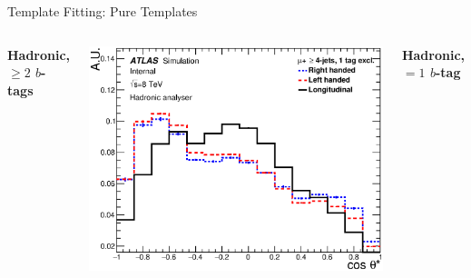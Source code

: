 \documentclass{beamer}
\begin{document}
{\begin{frame}[noframenumbering]{Template Fitting: Pure Templates}
{\begin{columns}
        \textbf{Hadronic, $\geq2$ $b$-tags}
        \begin{center}\includegraphics[width=1.16\textwidth]{../chapters/whel/figures/templatePlots/Hadronic/Signal_Templates_1excl_mu_had}\end{center}\vspace{-15pt}\centering\tiny
        \textbf{Hadronic, $=1$ $b$-tag}
      \end{columns}
    }
  \end{frame}


}
\end{document}
